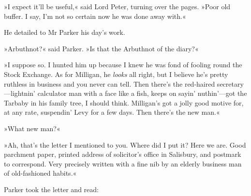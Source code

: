 »I expect it'll be useful,« said Lord Peter, turning over the pages. »Poor old buffer. I say, I'm not so certain now he was done away with.«

He detailed to Mr Parker his day's work.

»Arbuthnot?« said Parker. »Is that the Arbuthnot of the diary?«

»I suppose so. I hunted him up because I knew he was fond of fooling round the Stock Exchange. As for Milligan, he \textit{looks} all right, but I believe he's pretty ruthless in business and you never can tell. Then there's the red-haired secretary—lightnin' calculator man with a face like a fish, keeps on sayin' nuthin'---got the Tarbaby in his family tree, I should think. Milligan's got a jolly good motive for, at any rate, suspendin' Levy for a few days. Then there's the new man.«

»What new man?«

»Ah, that's the letter I mentioned to you. Where did I put it? Here we are. Good parchment paper, printed address of solicitor's office in Salisbury, and postmark to correspond. Very precisely written with a fine nib by an elderly business man of old-fashioned habits.«

Parker took the letter and read:

\makeatletter
{}
{%
\clearpage
}{%

}
\makeatother


